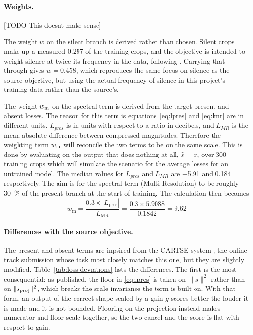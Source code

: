 \paragraph{Weights.} [TODO This doesnt make sense]

The weight $w$ on the silent branch is derived rather than chosen. Silent crops make up a measured \num{0.297} of the training crops, and the objective is intended to weight silence at twice its frequency in the data, following \cite{li2026cartse}. Carrying that through gives $w = 0.458$, which reproduces the same focus on silence as the source objective, but using the actual frequency of silence in this project's training data rather than the source's.

The weight $w_\textup{m}$ on the spectral term is derived from the target present and absent losses. The reason for this term is  equations~\eqref{eq:lpres} and \eqref{eq:lmr} are in different units. $L_{pres}$ is in units with respect to a ratio in decibels, and $L_{MR}$ is the mean absolute difference between compressed magnitudes. Therefore the weighting term $w_\textup{m}$ will reconcile the two terms to be on the same scale.
This is done by evaluating on the output that does nothing at all, $\hat{s} = x$, over 300 training crops which will simulate the scenario for the average losses for an untrained model. The median values for $L_{pres}$ and $L_{MR}$ are \num{-5.91} and \num{0.184} respectively. The aim is for the spectral term (Multi-Resolution) to be roughly \SI{30}{\percent} of the present branch at the start of training. The calculation then becomes  
 $$w_\text{m} = \frac{0.3 \times |L_\text{pres}|}{L_\text{MR}} =  \frac{0.3 \times 5.9088}{0.1842} = 9.62$$

\paragraph{Differences with the source objective.}
The present and absent terms are inpsired from the CARTSE system \cite{li2026cartse}, the online-track submission whose task most closely matches this one, but they are slightly modified. Table~\ref{tab:loss-deviations} lists the differences. The first is the most consequential: as published, the floor in \eqref{eq:lpres} is taken on $\lVert s \rVert^2$ rather than on $\lVert s_\textup{proj} \rVert^2$, which breaks the scale invariance the term is built on. With that form, an output of the correct shape scaled by a gain $g$ scores better the louder it is made and it is not bounded. Flooring on the projection instead makes numerator and floor scale together, so the two cancel and the score is flat with respect to gain.

